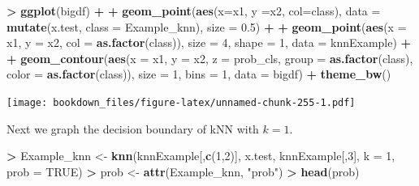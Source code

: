 \documentclass[]{krantz}
\makeatletter
\newenvironment{Shaded}{\begin{snugshade}}{\end{snugshade}}
\newcommand{\KeywordTok}[1]{\textcolor[rgb]{0.27,0.27,0.27}{\textbf{#1}}}
\newcommand{\DataTypeTok}[1]{\textcolor[rgb]{0.27,0.27,0.27}{#1}}
\newcommand{\DecValTok}[1]{\textcolor[rgb]{0.06,0.06,0.06}{#1}}
\newcommand{\FloatTok}[1]{\textcolor[rgb]{0.06,0.06,0.06}{#1}}
\newcommand{\StringTok}[1]{\textcolor[rgb]{0.5,0.5,0.5}{#1}}
\newcommand{\OtherTok}[1]{\textcolor[rgb]{0.37,0.37,0.37}{#1}}
\newcommand{\OperatorTok}[1]{\textcolor[rgb]{0.43,0.43,0.43}{\textbf{#1}}}
\newcommand{\NormalTok}[1]{#1}
\newenvironment{kframe}{%
\medskip{}
\setlength{\fboxsep}{.8em}
 \def\at@end@of@kframe{}%
 \ifinner\ifhmode%
  \def\at@end@of@kframe{\end{minipage}}%
  \begin{minipage}{\columnwidth}%
 \fi\fi%
 \def\FrameCommand##1{\hskip\@totalleftmargin \hskip-\fboxsep
 \colorbox{shadecolor}{##1}\hskip-\fboxsep
     \hskip-\linewidth \hskip-\@totalleftmargin \hskip\columnwidth}%
 \MakeFramed {\advance\hsize-\width
   \@totalleftmargin\z@ \linewidth\hsize
   \@setminipage}}%
 {\par\unskip\endMakeFramed%
 \at@end@of@kframe}
\renewenvironment{Shaded}{\begin{kframe}}{\end{kframe}}
\makeatother
\begin{document}
\begin{Shaded}
\begin{Highlighting}[]
\OperatorTok{>}\StringTok{ }\KeywordTok{ggplot}\NormalTok{(bigdf) }\OperatorTok{+}\StringTok{ }
\OperatorTok{+}\StringTok{    }\KeywordTok{geom_point}\NormalTok{(}\KeywordTok{aes}\NormalTok{(}\DataTypeTok{x=}\NormalTok{x1, }\DataTypeTok{y =}\NormalTok{x2, }\DataTypeTok{col=}\NormalTok{class), }\DataTypeTok{data =} \KeywordTok{mutate}\NormalTok{(x.test, }\DataTypeTok{class =}\NormalTok{ Example_knn), }\DataTypeTok{size =} \FloatTok{0.5}\NormalTok{) }\OperatorTok{+}\StringTok{ }
\OperatorTok{+}\StringTok{    }\KeywordTok{geom_point}\NormalTok{(}\KeywordTok{aes}\NormalTok{(}\DataTypeTok{x =}\NormalTok{ x1, }\DataTypeTok{y =}\NormalTok{ x2, }\DataTypeTok{col =} \KeywordTok{as.factor}\NormalTok{(class)), }\DataTypeTok{size =} \DecValTok{4}\NormalTok{, }\DataTypeTok{shape =} \DecValTok{1}\NormalTok{, }\DataTypeTok{data =}\NormalTok{ knnExample) }\OperatorTok{+}\StringTok{ }
\OperatorTok{+}\StringTok{    }\KeywordTok{geom_contour}\NormalTok{(}\KeywordTok{aes}\NormalTok{(}\DataTypeTok{x =}\NormalTok{ x1, }\DataTypeTok{y =}\NormalTok{ x2, }\DataTypeTok{z =}\NormalTok{ prob_cls, }\DataTypeTok{group =} \KeywordTok{as.factor}\NormalTok{(class), }\DataTypeTok{color =} \KeywordTok{as.factor}\NormalTok{(class)), }\DataTypeTok{size =} \DecValTok{1}\NormalTok{, }\DataTypeTok{bins =} \DecValTok{1}\NormalTok{, }\DataTypeTok{data =}\NormalTok{ bigdf) }\OperatorTok{+}\StringTok{ }\KeywordTok{theme_bw}\NormalTok{()}
\end{Highlighting}
\end{Shaded}

\texttt{[image: bookdown\_files/figure-latex/unnamed-chunk-255-1.pdf]}

Next we graph the decision boundary of kNN with \(k=1\).

\begin{Shaded}
\begin{Highlighting}[]
\OperatorTok{>}\StringTok{ }\NormalTok{Example_knn <-}\StringTok{ }\KeywordTok{knn}\NormalTok{(knnExample[,}\KeywordTok{c}\NormalTok{(}\DecValTok{1}\NormalTok{,}\DecValTok{2}\NormalTok{)], x.test, knnExample[,}\DecValTok{3}\NormalTok{], }\DataTypeTok{k =} \DecValTok{1}\NormalTok{, }\DataTypeTok{prob =} \OtherTok{TRUE}\NormalTok{)}
\OperatorTok{>}\StringTok{ }\NormalTok{prob <-}\StringTok{ }\KeywordTok{attr}\NormalTok{(Example_knn, }\StringTok{"prob"}\NormalTok{)}
\OperatorTok{>}\StringTok{ }\KeywordTok{head}\NormalTok{(prob)}
\end{Highlighting}
\end{Shaded}
\end{document}
